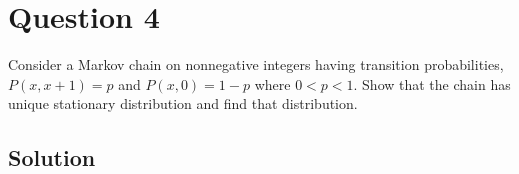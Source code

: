 \section*{Question 4}

Consider a Markov chain on nonnegative integers having transition probabilities, \( P(x, x+1)=p \) and \( P(x, 0)=1-p \) where \( 0<p<1 \).
Show that the chain has unique stationary distribution and find that distribution.

\subsection*{Solution}
